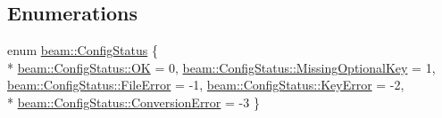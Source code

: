\subsection*{Enumerations}
\begin{DoxyCompactItemize}
\item 
enum \hyperlink{group__utils_ga6b948c6f49abd3a3de95390efacfba63}{beam\+::\+Config\+Status} \{ \\*
\hyperlink{group__utils_gga6b948c6f49abd3a3de95390efacfba63ae0aa021e21dddbd6d8cecec71e9cf564}{beam\+::\+Config\+Status\+::\+OK} = 0, 
\hyperlink{group__utils_gga6b948c6f49abd3a3de95390efacfba63ab150e1b84c6f67e2bebfa5a682f71a37}{beam\+::\+Config\+Status\+::\+Missing\+Optional\+Key} = 1, 
\hyperlink{group__utils_gga6b948c6f49abd3a3de95390efacfba63a06344c468073b2b66824779ffa5105cc}{beam\+::\+Config\+Status\+::\+File\+Error} = -\/1, 
\hyperlink{group__utils_gga6b948c6f49abd3a3de95390efacfba63ac84999914a408f8c02b4122a49df6e00}{beam\+::\+Config\+Status\+::\+Key\+Error} = -\/2, 
\\*
\hyperlink{group__utils_gga6b948c6f49abd3a3de95390efacfba63a33f8a28d3c790e00d94cc848895dfb51}{beam\+::\+Config\+Status\+::\+Conversion\+Error} = -\/3
 \}
\end{DoxyCompactItemize}
